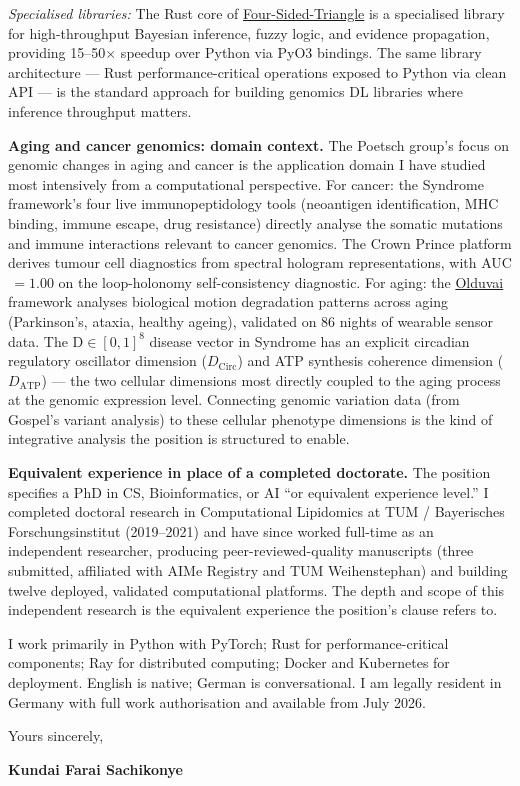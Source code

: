 \documentclass[12pt,a4paper]{article}
\begin{document}
\textit{Specialised libraries:} The Rust core of
\href{https://github.com/fullscreen-triangle/four-sided-triangle}{Four-Sided-Triangle}
is a specialised library for high-throughput Bayesian inference, fuzzy logic,
and evidence propagation, providing 15--50$\times$ speedup over Python via
PyO3 bindings. The same library architecture --- Rust performance-critical
operations exposed to Python via clean API --- is the standard approach for
building genomics DL libraries where inference throughput matters.

\textbf{Aging and cancer genomics: domain context.}
The Poetsch group's focus on genomic changes in aging and cancer is the
application domain I have studied most intensively from a computational
perspective.
For cancer: the Syndrome framework's four live immunopeptidology tools
(neoantigen identification, MHC binding, immune escape, drug resistance)
directly analyse the somatic mutations and immune interactions relevant to
cancer genomics. The Crown Prince platform derives tumour cell diagnostics
from spectral hologram representations, with AUC$\,=1.00$ on the loop-holonomy
self-consistency diagnostic.
For aging: the \href{https://rembling-trambling.vercel.app}{Olduvai}
framework analyses biological motion degradation patterns across aging
(Parkinson's, ataxia, healthy ageing), validated on 86 nights of wearable
sensor data. The D$\in[0,1]^8$ disease vector in Syndrome has an explicit
circadian regulatory oscillator dimension ($D_\mathrm{Circ}$) and ATP synthesis
coherence dimension ($D_\mathrm{ATP}$) --- the two cellular dimensions most
directly coupled to the aging process at the genomic expression level.
Connecting genomic variation data (from Gospel's variant analysis) to these
cellular phenotype dimensions is the kind of integrative analysis the position
is structured to enable.

\textbf{Equivalent experience in place of a completed doctorate.}
The position specifies a PhD in CS, Bioinformatics, or AI ``or equivalent
experience level.''
I completed doctoral research in Computational Lipidomics at TUM /
Bayerisches Forschungsinstitut (2019--2021) and have since worked full-time
as an independent researcher, producing peer-reviewed-quality manuscripts
(three submitted, affiliated with AIMe Registry and TUM Weihenstephan) and
building twelve deployed, validated computational platforms.
The depth and scope of this independent research is the equivalent experience
the position's clause refers to.

I work primarily in Python with PyTorch; Rust for performance-critical
components; Ray for distributed computing; Docker and Kubernetes for deployment.
English is native; German is conversational.
I am legally resident in Germany with full work authorisation and available
from July 2026.

\vspace{1.5em}
Yours sincerely,

\vspace{2.5em}
\textbf{Kundai Farai Sachikonye}
\end{document}
